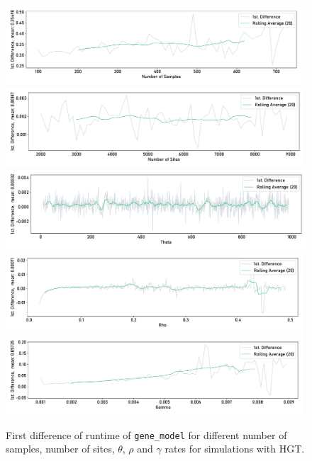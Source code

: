 \begin{figure}[H]
    \begin{flushright}
        \includegraphics[width=0.983\textwidth]{figures/runtime/hgt_num_samples_diff.pdf}\\
        \includegraphics[width=0.992\textwidth]{figures/runtime/hgt_num_sites_diff.pdf}\\
        \includegraphics[width=\textwidth]{figures/runtime/hgt_theta_diff.pdf}\\
        \includegraphics[width=0.988\textwidth]{figures/runtime/hgt_rho_diff.pdf}\\
        \includegraphics[width=0.988\textwidth]{figures/runtime/hgt_hgt_rate_diff.pdf}
    \end{flushright}
    \centering
    \caption[First difference of runtime with HGT.]{First difference of runtime of \texttt{gene_model} for different number of samples, number of sites, $\theta$, $\rho$ and $\gamma$ rates
        for simulations with HGT.}
    \label{app:diff-runtime-hgt}
\end{figure}
